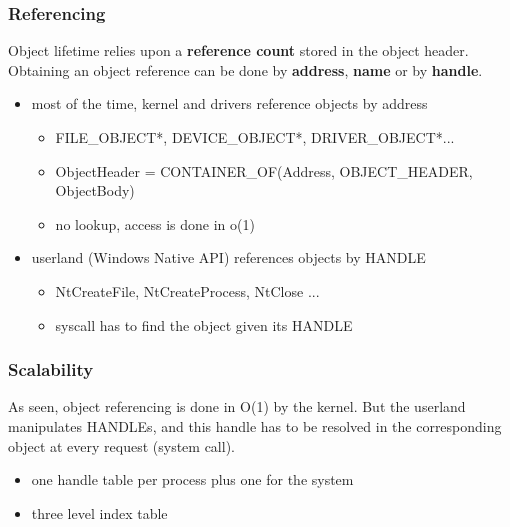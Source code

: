 \begin{frame}
  \frametitle{Referencing}

  Object lifetime relies upon a \textbf{reference count} stored in the object header.
  Obtaining an object reference can be done by \textbf{address}, \textbf{name} or by
  \textbf{handle}.

  \begin{itemize}
    \item
      most of the time, kernel and drivers reference objects by address

      \begin{itemize}
        \item
          FILE\_OBJECT*, DEVICE\_OBJECT*, DRIVER\_OBJECT*...
        \item
          ObjectHeader = CONTAINER\_OF(Address, OBJECT\_HEADER, ObjectBody)
        \item
          no lookup, access is done in o(1)
      \end{itemize}

    \item
      userland (Windows Native API) references objects by HANDLE
      \begin{itemize}
        \item
          NtCreateFile, NtCreateProcess, NtClose ...
        \item
          syscall has to find the object given its HANDLE
      \end{itemize}
  \end{itemize}

\end{frame}



\begin{frame}
  \frametitle{Scalability}

  As seen, object referencing is done in O(1) by the kernel. But the
  userland manipulates HANDLEs, and this handle has to be resolved in
  the corresponding object at every request (system call).

  \begin{itemize}
    \item
       one handle table per process plus one for the system
    \item
      three level index table
  \end{itemize}
\end{frame}


